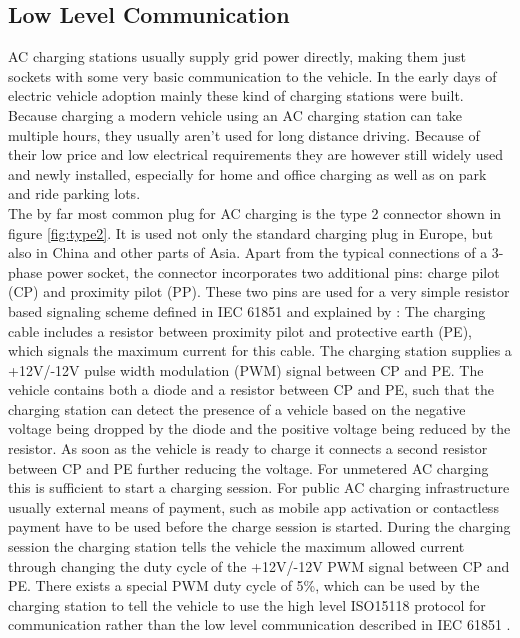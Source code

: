 \documentclass[conference,flushend]{iaria} %
\begin{document}
\subsection{Low Level Communication}
AC charging stations usually supply grid power directly, making them just sockets with some very basic communication to the vehicle.
In the early days of electric vehicle adoption mainly these kind of charging stations were built.
Because charging a modern vehicle using an AC charging station can take multiple hours, they usually aren't used for long distance driving.
Because of their low price and low electrical requirements they are however still widely used and newly installed, especially for home and office charging as well as on park and ride parking lots. \\
The by far most common plug for AC charging is the type 2 connector shown in figure \ref{fig:type2}. It is used not only the standard charging plug in Europe, but also in China and other parts of Asia.
Apart from the typical connections of a 3-phase power socket, the connector incorporates two additional pins: charge pilot (CP) and proximity pilot (PP).
These two pins are used for a very simple resistor based signaling scheme defined in IEC 61851 \cite{iec_iec_2010} and explained by \cite{dalheimer_ladeinfrastruktur_2017}:
The charging cable includes a resistor between proximity pilot and protective earth (PE), which signals the maximum current for this cable.
The charging station supplies a +12V/-12V pulse width modulation (PWM) signal between CP and PE.
The vehicle contains both a diode and a resistor between CP and PE, such that the charging station can detect the presence of a vehicle based on the negative voltage being dropped by the diode and the positive voltage being reduced by the resistor.
As soon as the vehicle is ready to charge it connects a second resistor between CP and PE further reducing the voltage.
For unmetered AC charging this is sufficient to start a charging session.
For public AC charging infrastructure usually external means of payment, such as mobile app activation or contactless payment have to be used before the charge session is started.
During the charging session the charging station tells the vehicle the maximum allowed current through changing the duty cycle of the +12V/-12V PWM signal between CP and PE.
There exists a special PWM duty cycle of 5\%, which can be used by the charging station to tell the vehicle to use the high level ISO15118 protocol for communication rather than the low level communication described in IEC 61851 \cite{iec_iec_2010}.
\end{document}
